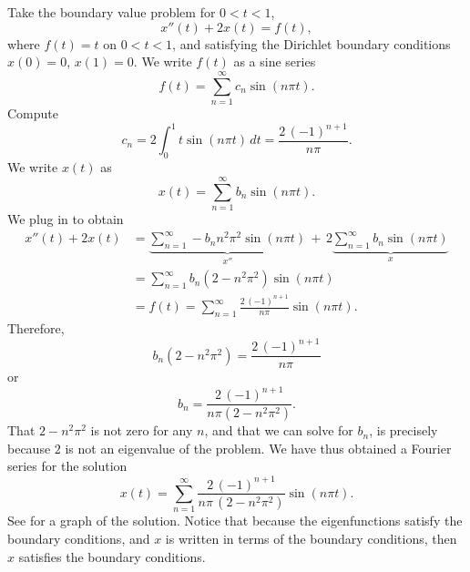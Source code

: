 \begin{example}
Take the boundary value problem for $0 < t < 1$,
\begin{equation*}
x''(t) + 2 x(t) = f(t) ,
\end{equation*}
where $f(t) = t$ on $0 < t < 1$, and 
satisfying the Dirichlet boundary conditions
$x(0) = 0$, $x(1)=0$.
We write $f(t)$ as a sine series
\begin{equation*}
f(t) = \sum_{n=1}^\infty c_n \sin (n \pi t) .
\end{equation*}
Compute
\begin{equation*}
c_n = 2 \int_0^1 t \sin (n \pi t) \,dt = \frac{2 \, {(-1)}^{n+1}}{n \pi} .
\end{equation*}
We write $x(t)$ as
\begin{equation*}
x(t) = \sum_{n=1}^\infty b_n \sin (n \pi t) .
\end{equation*}
We plug in to obtain 
\begin{equation*}
\begin{split}
x''(t) + 2 x(t) & =
\underbrace{
\sum_{n=1}^\infty - b_n n^2 \pi^2 \sin (n \pi t)
}_{x''}
\,
+
\,
2
\underbrace{
\sum_{n=1}^\infty b_n \sin (n \pi t)
}_{x}
\\
& =
\sum_{n=1}^\infty b_n (2 - n^2 \pi^2 ) \sin (n \pi t)
\\
& = f(t)
=
\sum_{n=1}^\infty  \frac{2\, {(-1)}^{n+1}}{n \pi} \sin (n \pi t) .
\end{split}
\end{equation*}
Therefore,
\begin{equation*}
b_n (2 - n^2 \pi^2)
=
\frac{2\,{(-1)}^{n+1}}{n \pi}
\end{equation*}
or
\begin{equation*}
b_n
=
\frac{2\,{(-1)}^{n+1}}{n \pi (2 - n^2 \pi^2)} .
\end{equation*}
That $2-n^2\pi^2$ is not zero for any $n$, and that we can
solve for $b_n$, is precisely because
$2$ is not an eigenvalue of the problem.
We have thus obtained a Fourier series for the solution
\begin{equation*}
x(t) = 
\sum_{n=1}^\infty
\frac{2\,{(-1)}^{n+1}}{n \pi \,(2 - n^2 \pi^2)}
\sin (n \pi t) .
\end{equation*}
See  for a graph of the solution.
Notice that because the eigenfunctions satisfy the boundary conditions, 
and $x$ is written in terms of the boundary conditions, then $x$
satisfies the boundary conditions.
\begin{myfig}
\capstart
{}
\caption{Plot of the solution of $x''+2x=t$, $x(0)=0$, $x(1)=0$.%
\label{bnd-dirich-graph:fig}}
\end{myfig}
\end{example}

